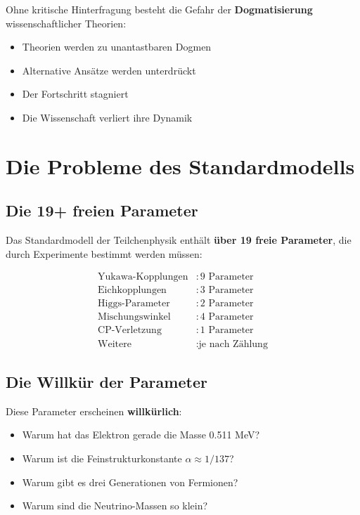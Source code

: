 \documentclass[12pt,a4paper]{report}
\begin{document}
	Ohne kritische Hinterfragung besteht die Gefahr der \textbf{Dogmatisierung} wissenschaftlicher Theorien:
	
	\begin{itemize}
		\item Theorien werden zu unantastbaren Dogmen
		\item Alternative Ansätze werden unterdrückt
		\item Der Fortschritt stagniert
		\item Die Wissenschaft verliert ihre Dynamik
	\end{itemize}
	
	\section{Die Probleme des Standardmodells}
	
	\subsection{Die 19+ freien Parameter}
	
	Das Standardmodell der Teilchenphysik enthält \textbf{über 19 freie Parameter}, die durch Experimente bestimmt werden müssen:
	
	\begin{align}
		\text{Yukawa-Kopplungen} &: 9 \text{ Parameter} \\
		\text{Eichkopplungen} &: 3 \text{ Parameter} \\
		\text{Higgs-Parameter} &: 2 \text{ Parameter} \\
		\text{Mischungswinkel} &: 4 \text{ Parameter} \\
		\text{CP-Verletzung} &: 1 \text{ Parameter} \\
		\text{Weitere} &: \text{je nach Zählung}
	\end{align}
	
	\subsection{Die Willkür der Parameter}
	
	Diese Parameter erscheinen \textbf{willkürlich}:
	
	\begin{itemize}
		\item Warum hat das Elektron gerade die Masse 0.511 MeV?
		\item Warum ist die Feinstrukturkonstante $\alpha \approx 1/137$?
		\item Warum gibt es drei Generationen von Fermionen?
		\item Warum sind die Neutrino-Massen so klein?
	\end{itemize}
	
\end{document}
